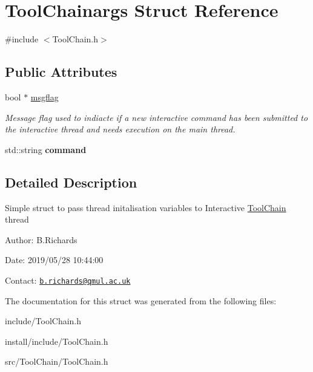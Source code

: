 \hypertarget{structToolChainargs}{\section{Tool\-Chainargs Struct Reference}
\label{structToolChainargs}
}


{\ttfamily \#include $<$Tool\-Chain.\-h$>$}

\subsection*{Public Attributes}
\begin{DoxyCompactItemize}
\item 
\hypertarget{structToolChainargs_a12b7600b4c7a0362703a1d75d6090ee5}{bool $\ast$ \hyperlink{structToolChainargs_a12b7600b4c7a0362703a1d75d6090ee5}{msgflag}}\label{structToolChainargs_a12b7600b4c7a0362703a1d75d6090ee5}

\begin{DoxyCompactList}\small\item\em Message flag used to indiacte if a new interactive command has been submitted to the interactive thread and needs execution on the main thread. \end{DoxyCompactList}\item 
\hypertarget{structToolChainargs_a9d4c78b8b89eba4b7e8af9e6278c1bfd}{std\-::string {\bfseries command}}\label{structToolChainargs_a9d4c78b8b89eba4b7e8af9e6278c1bfd}

\end{DoxyCompactItemize}


\subsection{Detailed Description}
Simple struct to pass thread initalisation variables to Interactive \hyperlink{classToolChain}{Tool\-Chain} thread

\begin{DoxyParagraph}{Author\-:}
B.\-Richards 
\end{DoxyParagraph}
\begin{DoxyParagraph}{Date\-:}
2019/05/28 10\-:44\-:00 
\end{DoxyParagraph}
Contact\-: \href{mailto:b.richards@qmul.ac.uk}{\tt b.\-richards@qmul.\-ac.\-uk} 

The documentation for this struct was generated from the following files\-:\begin{DoxyCompactItemize}
\item 
include/Tool\-Chain.\-h\item 
install/include/Tool\-Chain.\-h\item 
src/\-Tool\-Chain/Tool\-Chain.\-h\end{DoxyCompactItemize}
